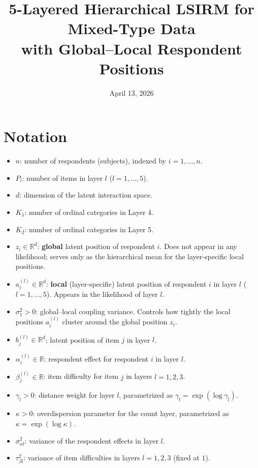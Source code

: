 \documentclass[11pt]{article}
\title{5-Layered Hierarchical LSIRM for Mixed-Type Data\\with Global--Local Respondent Positions}
\date{April 13, 2026}
\begin{document}
\maketitle

\section{Notation}

\begin{itemize}[leftmargin=1.5em]
    \item $n$: number of respondents (subjects), indexed by $i=1,\dots,n$.
    \item $P_l$: number of items in layer $l$ ($l=1,\dots,5$).
    \item $d$: dimension of the latent interaction space.
    \item $K_1$: number of ordinal categories in Layer 4.
    \item $K_2$: number of ordinal categories in Layer 5.
    \item $z_i \in \mathbb{R}^d$: \textbf{global} latent position of respondent $i$. Does not appear in any likelihood; serves only as the hierarchical mean for the layer-specific local positions.
    \item $a_i^{(l)} \in \mathbb{R}^d$: \textbf{local} (layer-specific) latent position of respondent $i$ in layer $l$ ($l=1,\dots,5$). Appears in the likelihood of layer $l$.
    \item $\sigma_1^2 > 0$: global--local coupling variance. Controls how tightly the local positions $a_i^{(l)}$ cluster around the global position $z_i$.
    \item $b_j^{(l)} \in \mathbb{R}^d$: latent position of item $j$ in layer $l$.
    \item $\alpha_i^{(l)} \in \mathbb{R}$: respondent effect for respondent $i$ in layer $l$.
    \item $\beta_j^{(l)} \in \mathbb{R}$: item difficulty for item $j$ in layers $l=1,2,3$.
    \item $\gamma_l > 0$: distance weight for layer $l$, parametrized as $\gamma_l = \exp(\log \gamma_l)$.
    \item $\kappa > 0$: overdispersion parameter for the count layer, parametrized as $\kappa = \exp(\log \kappa)$.
    \item $\sigma_{\alpha l}^2$: variance of the respondent effects in layer $l$.
    \item $\tau_{\beta l}^2$: variance of item difficulties in layers $l=1,2,3$ (fixed at $1$).

\end{itemize}
\end{document}
